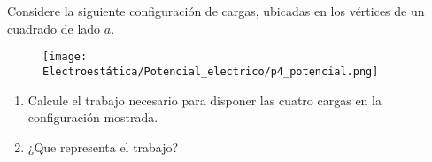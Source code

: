 \np
Considere la siguiente configuración de cargas, ubicadas en los vértices de un cuadrado de lado $a$.

\begin{figure}[H]
\texttt{[image: Electroestática/Potencial\_electrico/p4\_potencial.png]}
\centering
\end{figure}

\begin{enumerate}[label=\alph*)]
    \item Calcule el trabajo necesario para disponer las cuatro cargas en la configuración mostrada.
    \item ¿Que representa el trabajo?
\end{enumerate}


\newpage